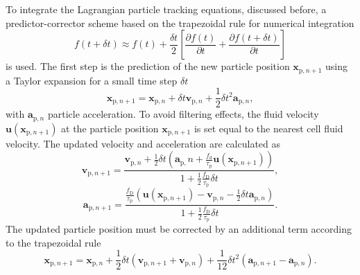 \documentclass[11pt,a4paper,openany,oneside,parskip=half*]{article}
\renewcommand*\vec[1]{\boldsymbol{#1}}
\begin{document}
To integrate the Lagrangian particle tracking equations, discussed before, a predictor-corrector scheme based on the trapezoidal rule for numerical integration
\begin{equation}
f (t + \delta t) \approx f(t) + \frac{\delta t}{2} \left[ \frac{\partial f(t)}{\partial t} + \frac{\partial f(t + \delta t)}{\partial t} \right ]
\end{equation}
is used.
\newline
The first step is the prediction of the new particle position $\vec{x}_{\mathrm{p}, n+1}$ using a Taylor expansion for a small time step $\delta t$
\begin{equation}
\vec{x}_{\mathrm{p}, n+1} = \vec{x}_{\mathrm{p}, n} + \delta t \vec{v}_{\mathrm{p}, n} + \frac{1}{2} \delta t^2 \vec{a}_{\mathrm{p}, n},
\end{equation}
with $\vec{a}_{\mathrm{p}, n}$ particle acceleration. 
\newline
To avoid filtering effects, the fluid velocity $\vec{u}(\vec{x}_{\mathrm{p}, n+1})$ at the particle position $\vec{x}_{\mathrm{p}, n+1}$ is set equal to the nearest cell fluid velocity. 
\newline
The updated velocity and acceleration are calculated as
\begin{equation}
\vec{v}_{\mathrm{p}, n+1} = \frac{\vec{v}_{\mathrm{p}, n} + \frac{1}{2} \delta t \left(\vec{a}_{\mathrm{p}, }n + \frac{f_\mathrm{d}}{\tau_\mathrm{p}}\vec{u}(\vec{x}_{\mathrm{p}, n+1}) \right)}{1 + \frac{1}{2} \frac{f_\mathrm{D}}{\tau_\mathrm{p}} \delta t},
\end{equation}
\begin{equation}
\vec{a}_{\mathrm{p}, n+1} = \frac{\frac{f_\mathrm{D}}{\tau_\mathrm{p}} \left(\vec{u}(\vec{x}_{\mathrm{p}, n+1}) - \vec{v}_{\mathrm{p}, n} - \frac{1}{2} \delta t \vec{a}_{\mathrm{p}, n} \right)}{1 + \frac{1}{2} \frac{f_\mathrm{D}}{\tau_\mathrm{p}} \delta t}.
\end{equation}
The updated particle position must be corrected by an additional term according to the trapezoidal rule
\begin{equation}
\vec{x}_{\mathrm{p}, n+1} = \vec{x}_{\mathrm{p}, n} + \frac{1}{2} \delta t \left( \vec{v}_{\mathrm{p}, n+1} + \vec{v}_{\mathrm{p}, n} \right) + \frac{1}{12} \delta t^2 \left( \vec{a}_{\mathrm{p}, n+1} - \vec{a}_{\mathrm{p}, n} \right).
\end{equation}
\newline
\end{document}
